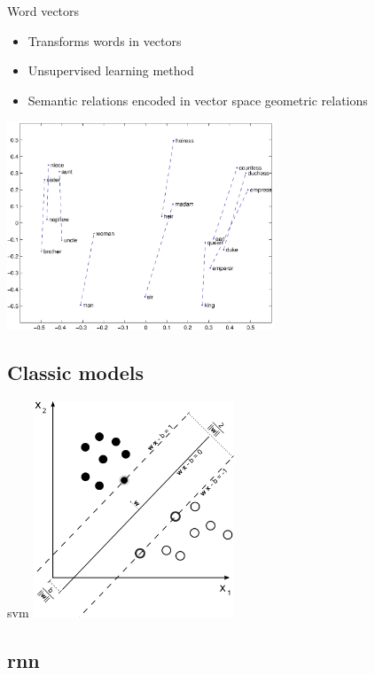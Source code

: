 \begin{frame}{Word vectors}
  \begin{itemize}
  \item \alert{Transforms} words in vectors
  \item \alert{Unsupervised} learning method
  \item \alert{Semantic} relations encoded in vector space geometric relations 
  \end{itemize}
  \begin{center}
    \includegraphics[width=0.6\textwidth]{img/man_woman.jpg}
  \end{center}
\end{frame}

\subsection{Classic models}

\begin{frame}{\acf{svm}}
  \centering
  \includegraphics[width=0.45\textwidth]{img/svm.png}
\end{frame}

\subsection{\acs{rnn}}


